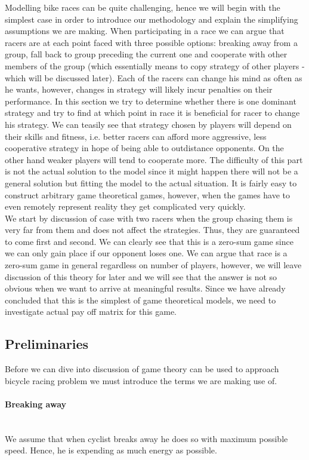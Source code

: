 \documentclass[10pt, a4paper]{report}
\begin{document}
Modelling bike races can be quite challenging, hence we will begin with the simplest case in order to introduce our methodology and explain the simplifying assumptions we are making. When participating in a race we can argue that racers are at each point faced with three possible options: breaking away from a group, fall back to group preceding the current one and cooperate with other members of the group (which essentially means to copy strategy of other players - which will be discussed later). Each of the racers can change his mind as often as he wants, however, changes in strategy will likely incur penalties on their performance. In this section we try to determine whether there is one dominant strategy and try to find at which point in race it is beneficial for racer to change his strategy. We can teasily see that strategy chosen by players will depend on their skills and fitness, i.e. better racers can afford more aggressive, less cooperative strategy in hope of being able to outdistance opponents. On the other hand weaker players will tend to cooperate more. The difficulty of this part is not the actual solution to the model since it might happen there will not be a general solution but fitting the model to the actual situation. It is fairly easy to construct arbitrary game theoretical games, however, when the games have to even remotely represent reality they get complicated very quickly.\\

We start by discussion of case with two racers when the group chasing them is very far from them and does not affect the strategies. Thus, they are guaranteed to come first and second. We can clearly see that this is a zero-sum game since we can only gain place if our opponent loses one. We can argue that race is a zero-sum game in general regardless on number of players, however, we will leave discussion of this theory for later and we will see that the answer is not so obvious when we want to arrive at meaningful results. Since we have already concluded that this is the simplest of game theoretical models, we need to investigate actual pay off matrix for this game.

\subsection{Preliminaries}
Before we can dive into discussion of game theory can be used to approach bicycle racing problem we must introduce the terms we are making use of.

\paragraph{Breaking away} ~\\
We assume that when cyclist breaks away he does so with maximum possible speed. Hence, he is expending as much energy as possible.
\end{document}
